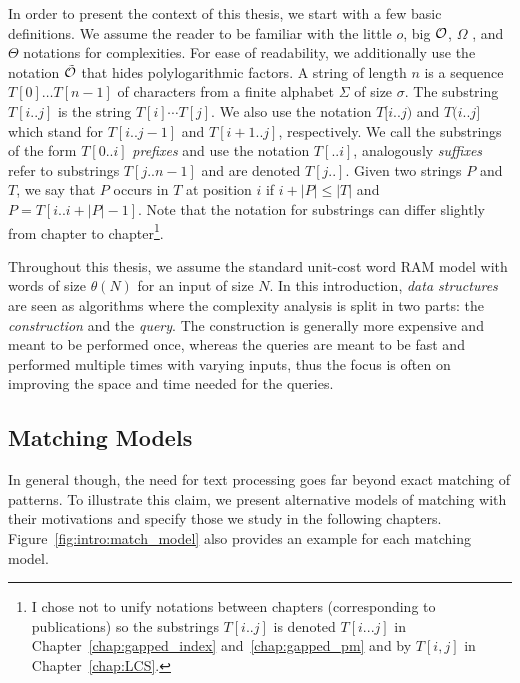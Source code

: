 In order to present the context of this thesis, we start with a few basic definitions. We assume the reader to be familiar with the little $o$, big $\mathcal{O}$, $\Omega$ , and $\Theta$ notations for complexities. %
For ease of readability, we additionally use the notation $\tilde{\mathcal{O}}$ that hides polylogarithmic factors. 
A string of length $n$ is a sequence $T[0] \dots T[n-1]$ of characters from a finite alphabet $\Sigma$ of size $\sigma$. The substring $T[i..j]$ is the string $T[i] \cdots T[j]$.
We also use the notation $T[i..j)$ and $T(i..j]$ which stand for $T[i..j-1]$ and $T[i+1..j]$, respectively. We call the substrings of the form $T[0..i]$ \emph{prefixes}  and use the notation $T[..i]$, analogously \emph{suffixes} refer to substrings $T[j..n-1]$ and are denoted $T[j..]$. Given two strings $P$ and $T$, we say that $P$ occurs in $T$ at position $i$ if $i+|P| \leq |T|$ and $P=T[i..i+|P|-1]$. Note that the notation for substrings can differ slightly from chapter to chapter\footnote{I chose not to unify notations between chapters (corresponding to publications) so the substrings $T[i..j]$ is denoted $T[i...j]$ in Chapter~\ref{chap:gapped_index} and~\ref{chap:gapped_pm} and by $T[i,j]$ in Chapter~\ref{chap:LCS}.}.

Throughout this thesis, we assume the standard unit-cost word RAM model with words of size $\theta(N)$ for an input of size $N$. In this introduction, \emph{data structures} are seen as algorithms where the complexity analysis is split in two parts: the \emph{construction} and the \emph{query}. The construction is generally more expensive and meant to be performed once, whereas the queries are meant to be fast and performed multiple times with varying inputs, thus the focus is often on improving the space and time needed for the queries. 


\subsection{Matching Models}\label{sec:intro:complex}



In general though, the need for text processing goes far beyond exact matching of patterns. To illustrate this claim, we present alternative models of matching with their motivations and specify those we study in the following chapters. Figure~\ref{fig:intro:match_model} also provides an example for each matching model.

